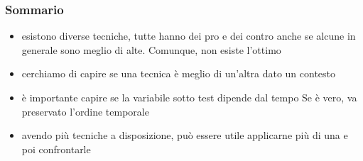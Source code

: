 \documentclass{article}
\begin{document}
\subsubsection{Sommario}
\begin{itemize}
\item esistono diverse tecniche, tutte hanno dei pro e dei contro anche se alcune in generale sono meglio di alte. Comunque, non esiste l'ottimo
\item cerchiamo di capire se una tecnica è meglio di un'altra dato un contesto
\item è importante capire se la variabile sotto test dipende dal tempo Se è vero, va preservato l'ordine temporale
\item avendo più tecniche a disposizione, può essere utile applicarne più di una e poi confrontarle
\end{itemize}
\end{document}
